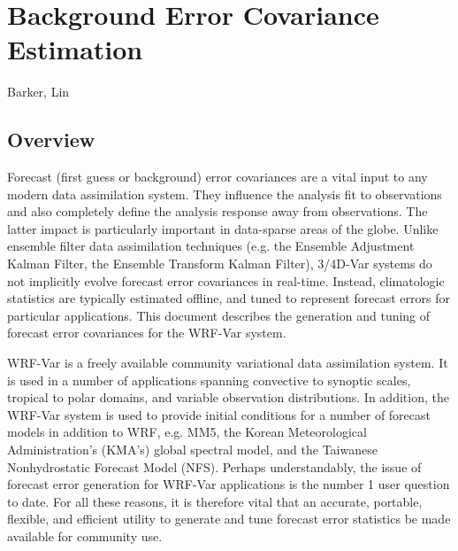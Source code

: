 \chapter{Background Error Covariance Estimation}
\label{gen_be}

Barker, Lin

\section{Overview}

Forecast (first guess or background) error covariances are a vital input to any modern data assimilation system. They influence the analysis fit to observations and also completely define the analysis response away from observations. The latter impact is particularly important in data-sparse areas of the globe. Unlike ensemble filter data assimilation techniques (e.g. the Ensemble Adjustment Kalman Filter, the Ensemble Transform Kalman Filter), 3/4D-Var systems do not implicitly evolve forecast error covariances in real-time. Instead, climatologic statistics are typically estimated offline, and tuned to represent forecast errors for particular applications. This document describes the generation and tuning of forecast error covariances for the WRF-Var system.

WRF-Var is a freely available community variational data assimilation system. It is used in a number of applications spanning convective to synoptic scales, tropical to polar domains, and variable observation distributions. In addition, the WRF-Var system is used to provide initial conditions for a number of forecast models in addition to WRF, e.g. MM5, the Korean Meteorological Administration's (KMA's) global spectral model, and the Taiwanese Nonhydrostatic Forecast Model (NFS). Perhaps understandably, the issue of forecast error generation for WRF-Var applications is the number 1 user question to date. For all these reasons, it is therefore vital that an accurate, portable, flexible, and efficient utility to generate and tune forecast error statistics be made available for community use. 

